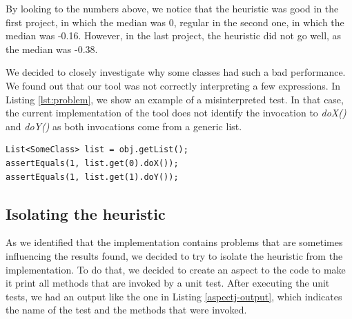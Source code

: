 \documentclass{sig-alternate}
\begin{document}
By looking to the numbers above, we notice that the heuristic was good in the first project,
in which the median was 0, regular in the second one, in which the median was -0.16. However,
in the last project, the heuristic did not go well, as the median was -0.38.

We decided to closely investigate why some classes had such a bad performance. We found out
that our tool was not correctly interpreting a few expressions. In Listing \ref{lst:problem}, we
show an example of a misinterpreted test. In that case, the current implementation of the 
tool does not identify the invocation to \textit{doX()} and \textit{doY()} as both invocations
come from a generic list.

\begin{lstlisting}
List<SomeClass> list = obj.getList();
assertEquals(1, list.get(0).doX());
assertEquals(1, list.get(1).doY());
\end{lstlisting}


\subsection{Isolating the heuristic}

As we identified that the implementation contains problems that are sometimes influencing the results found,
we decided to try to isolate the heuristic from the implementation. To do that, we decided to
create an aspect to the code to make it print all methods that are invoked by a unit test. After executing
the unit tests, we had an output
like the one in Listing \ref{aspectj-output}, which indicates the name of the test and the methods that were invoked.
\end{document}
